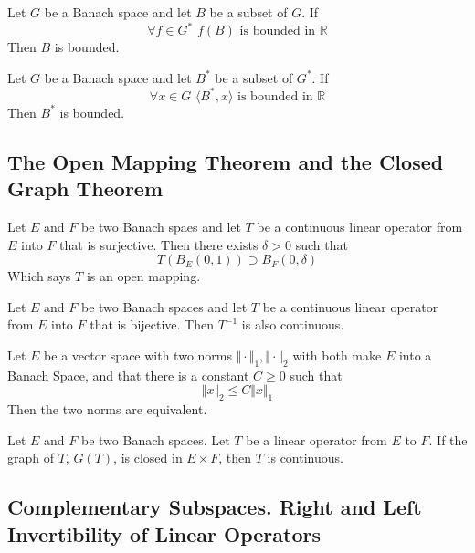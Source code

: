 \begin{cor}
Let $G$ be a Banach space and let $B$ be a subset of $G$. If
\[
	\forall f \in G^* \hspace{4pt} f(B) \text{ is bounded in } \mathbb{R}
\]
Then $B$ is bounded.
\end{cor}

\begin{cor}
Let $G$ be a Banach space and let $B^*$ be a subset of $G^*$. If
\[
	\forall x \in G \hspace{4pt} \langle B^*,x \rangle \text{ is bounded in } \mathbb{R}
\]
Then $B^*$ is bounded.
\end{cor}


\subsection{The Open Mapping Theorem and the Closed Graph Theorem}

\begin{thm}
Let $E$ and $F$ be two Banach spaes and let $T$ be a continuous linear operator from $E$ into $F$ that is surjective. Then there exists $ \delta > 0$ such that
\[
	T \left( B_E(0,1) \right) \supset B_F(0, \delta)
\]
Which says $T$ is an open mapping.
\end{thm}

\begin{cor}
Let $E$ and $F$ be two Banach spaces and let $T$ be a continuous linear operator from $E$ into $F$ that is bijective. Then $T^{-1}$ is also continuous.
\end{cor}

\begin{cor}
Let $E$ be a vector space with two norms $ \Vert \cdot \Vert_1, \Vert \cdot \Vert_2$ with both make $E$ into a Banach Space, and that there is a constant $C \geq 0$ such that
\[
\Vert x \Vert_2 \leq C \Vert x \Vert_1
\]
Then the two norms are equivalent.
\end{cor}

\begin{thm}
	Let $E$ and $F$ be two Banach spaces. Let $T$ be a linear operator from $E$ to $F$. If the graph of $T$, $G(T)$, is closed in $ E \times F$, then $T$ is continuous.
\end{thm}

\subsection{Complementary Subspaces. Right and Left Invertibility of Linear Operators}

